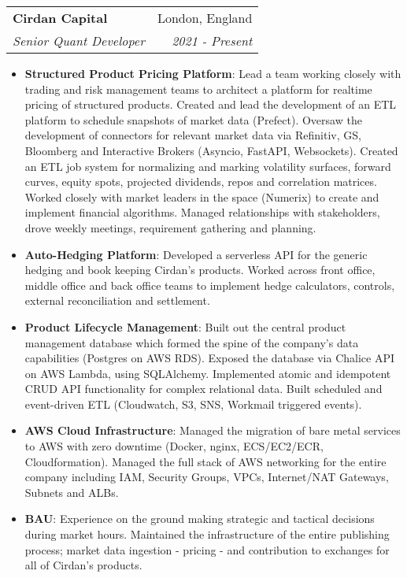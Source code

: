 \documentclass[letterpaper,11pt]{article}
\makeatletter
\newcommand{\resumeItem}[2]{
  \item\small{
    \textbf{#1}{: #2 \vspace{-2pt}}
  }
}
\newcommand{\resumeSubheading}[4]{
  \vspace{-1pt}\item
    \begin{tabular*}{0.97\textwidth}{l@{\extracolsep{\fill}}r}
      \textbf{#1} & #2 \\
      \textit{\small#3} & \textit{\small #4} \\
    \end{tabular*}\vspace{-5pt}
}
\newcommand{\resumeItemListStart}{\begin{itemize}}
\newcommand{\resumeItemListEnd}{\end{itemize}\vspace{-5pt}}
\makeatother
\begin{document}
    \resumeSubheading
    {Cirdan Capital}{London, England}
    {Senior Quant Developer}{2021 - Present}
    \resumeItemListStart
    \resumeItem{Structured Product Pricing Platform}
      {Lead a team working closely with trading and risk management teams to architect a platform for realtime pricing of structured products. Created and lead the development of an ETL platform to schedule snapshots of market data (Prefect). Oversaw the development of connectors for relevant market data via Refinitiv, GS, Bloomberg and Interactive Brokers (Asyncio, FastAPI, Websockets). Created an ETL job system for normalizing and marking volatility surfaces, forward curves, equity spots, projected dividends, repos and correlation matrices. Worked closely with market leaders in the space (Numerix) to create and implement financial algorithms. Managed relationships with stakeholders, drove weekly meetings, requirement gathering and planning.}
      \resumeItem{Auto-Hedging Platform}
        {Developed a serverless API for the generic hedging and book keeping Cirdan's products. Worked across front office, middle office and back office teams to implement hedge calculators, controls, external reconciliation and settlement.}
      \resumeItem{Product Lifecycle Management}
        {Built out the central product management database which formed the spine of the company's data capabilities (Postgres on AWS RDS). Exposed the database via Chalice API on AWS Lambda, using SQLAlchemy. Implemented atomic and idempotent CRUD API functionality for complex relational data. Built scheduled and event-driven ETL (Cloudwatch, S3, SNS, Workmail triggered events).}
      \resumeItem{AWS Cloud Infrastructure}
        {Managed the migration of bare metal services to AWS with zero downtime (Docker, nginx, ECS/EC2/ECR, Cloudformation). Managed the full stack of AWS networking for the entire company including IAM, Security Groups, VPCs, Internet/NAT Gateways, Subnets and ALBs.}
      \resumeItem{BAU}
        {Experience on the ground making strategic and tactical decisions during market hours. Maintained the infrastructure of the entire publishing process; market data ingestion - pricing - and contribution to exchanges for all of Cirdan's products.}
    \resumeItemListEnd
\end{document}
